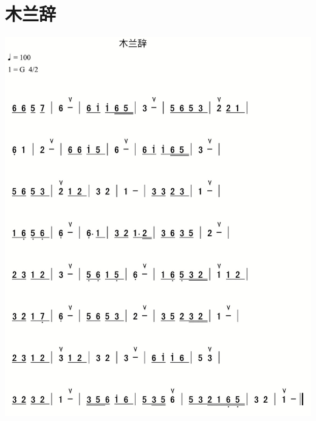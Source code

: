 \documentclass[cn,pad,chinese,chinesefont=nofont]{elegantbook}
\begin{document}
\section{木兰辞}
	\includegraphics[width=\textwidth]{dongxiao/IMG_0867-木兰辞.png}
\end{document}
